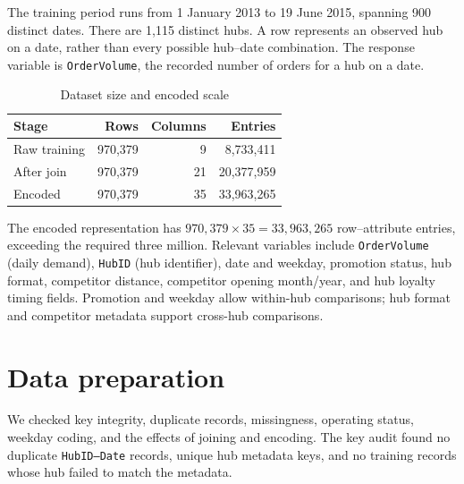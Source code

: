 \documentclass[10pt,a4paper,twocolumn]{article}
\begin{document}
The training period runs from 1 January 2013 to 19 June 2015, spanning 900 distinct dates. There are 1,115 distinct hubs. A row represents an observed hub on a date, rather than every possible hub--date combination. The response variable is \texttt{OrderVolume}, the recorded number of orders for a hub on a date.

\begin{table}[t]
\centering
\caption{Dataset size and encoded scale}
\label{tab:size}
\small
\begin{tabular}{lrrr}
\toprule
Stage & Rows & Columns & Entries\\
\midrule
Raw training & 970,379 & 9 & 8,733,411\\
After join & 970,379 & 21 & 20,377,959\\
Encoded & 970,379 & 35 & 33,963,265\\
\bottomrule
\end{tabular}
\end{table}
The encoded representation has $970{,}379 \times 35 = 33{,}963{,}265$ row--attribute entries, exceeding the required three million. Relevant variables include \texttt{OrderVolume} (daily demand), \texttt{HubID} (hub identifier), date and weekday, promotion status, hub format, competitor distance, competitor opening month/year, and hub loyalty timing fields. Promotion and weekday allow within-hub comparisons; hub format and competitor metadata support cross-hub comparisons.

\section{Data preparation}
We checked key integrity, duplicate records, missingness, operating status, weekday coding, and the effects of joining and encoding. The key audit found no duplicate \texttt{HubID--Date} records, unique hub metadata keys, and no training records whose hub failed to match the metadata.
\end{document}
